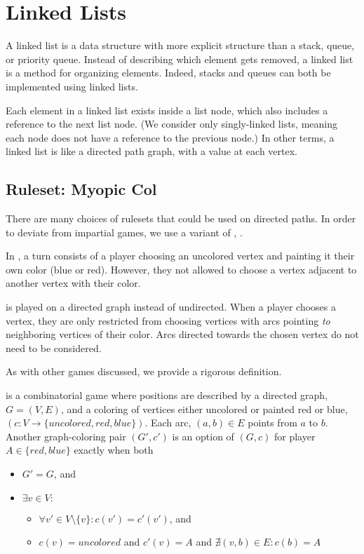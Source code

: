 \documentclass[letter,10pt]{article}
\begin{document}
\section{Linked Lists}
\label{section:linkedLists}

A linked list is a data structure with more explicit structure than a stack, queue, or priority queue.  Instead of describing which element gets removed, a linked list is a method for organizing elements.  Indeed, stacks and queues can both be implemented using linked lists.

Each element in a linked list exists inside a list node, which also includes a reference to the next list node.  (We consider only singly-linked lists, meaning each node does not have a reference to the previous node.)  In other terms, a linked list is like a directed path graph, with a value at each vertex.

\subsection{Ruleset: Myopic Col}\label{sec:myopiccol}\label{sec:myopiccol}\label{sec:myopiccol}\label{sec:myopiccol}\label{sec:myopiccol}

There are many choices of rulesets that could be used on directed paths.  In order to deviate from impartial games, we use a variant of , .  

In , a turn consists of a player choosing an uncolored vertex and painting it their own color (blue or red).  However, they not allowed to choose a vertex adjacent to another vertex with their color.

 is played on a directed graph instead of undirected.  When a player chooses a vertex, they are only restricted from choosing vertices with arcs pointing \emph{to} neighboring vertices of their color.  Arcs directed towards the chosen vertex do not need to be considered.

As with other games discussed, we provide a rigorous definition.

\begin{definition}
	\label{def:myopicCol}
	 is a combinatorial game where positions are described by a directed graph, $G = (V, E)$, and a coloring of vertices either uncolored or painted red or blue, $(c: V \rightarrow \{uncolored, red, blue\})$.  Each arc, $(a, b) \in E$ points from $a$ to $b$.  Another graph-coloring pair $(G', c')$ is an option of $(G, c)$ for player $A \in \{red, blue\}$ exactly when both
	\begin{itemize}
	  \item $G' = G$, and
	  \item $\exists v \in V:$ 
	  \begin{itemize}
	    \item $\forall v' \in V \setminus \{v\}: c(v') = c'(v')$, and
	    \item $c(v) = uncolored$ and $c'(v) = A$ and $\nexists (v,b) \in E: c(b) = A$
	   \end{itemize}
	\end{itemize}
\end{definition}
\end{document}
